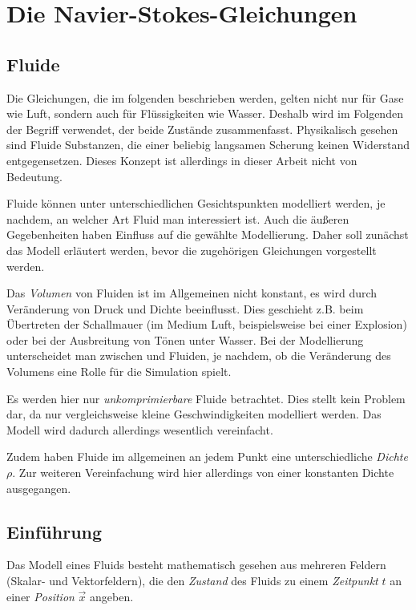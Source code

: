 \section{Die Navier-Stokes-Gleichungen}

\subsection{Fluide}

Die Gleichungen, die im folgenden beschrieben werden, gelten nicht nur für Gase
wie Luft, sondern auch für Flüssigkeiten wie Wasser. Deshalb wird im Folgenden
der Begriff  verwendet, der beide Zustände zusammenfasst.
Physikalisch gesehen sind Fluide Substanzen, die einer beliebig langsamen
Scherung keinen Widerstand entgegensetzen. Dieses Konzept ist allerdings in
dieser Arbeit nicht von Bedeutung.

Fluide können unter unterschiedlichen Gesichtspunkten modelliert werden, je
nachdem, an welcher Art Fluid man interessiert ist. Auch die äußeren
Gegebenheiten haben Einfluss auf die gewählte Modellierung. Daher soll zunächst
das Modell erläutert werden, bevor die zugehörigen Gleichungen vorgestellt
werden.

Das \emph{Volumen} von Fluiden ist im Allgemeinen nicht konstant, es wird durch
Veränderung von Druck und Dichte beeinflusst. Dies geschieht z.B. beim
Übertreten der Schallmauer (im Medium Luft, beispielsweise bei einer Explosion)
oder bei der Ausbreitung von Tönen unter Wasser. Bei der Modellierung
unterscheidet man zwischen  und
 Fluiden, je nachdem, ob die Veränderung des
Volumens eine Rolle für die Simulation spielt.

Es werden hier nur \emph{unkomprimierbare} Fluide betrachtet. Dies stellt kein
Problem dar, da nur vergleichsweise kleine Geschwindigkeiten modelliert werden.
Das Modell wird dadurch allerdings wesentlich vereinfacht.

Zudem haben Fluide im allgemeinen an jedem Punkt eine unterschiedliche
\emph{Dichte} $\rho$. Zur weiteren Vereinfachung wird hier allerdings von einer
konstanten Dichte ausgegangen.

\subsection{Einführung}

Das Modell eines Fluids besteht mathematisch gesehen aus mehreren Feldern
(Skalar- und Vektorfeldern), die den \emph{Zustand} des Fluids zu einem
\emph{Zeitpunkt} $t$ an einer \emph{Position} $\vec{x}$ angeben.

